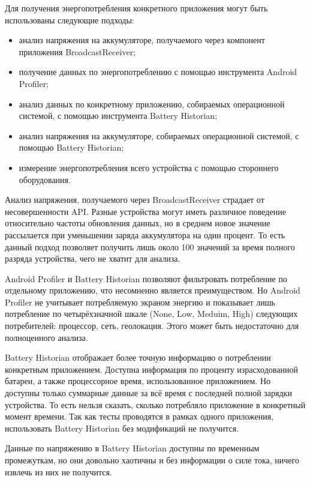 \documentclass[a4paper,14pt]{extarticle} %
\begin{document}
	Для получения энергопотребления конкретного приложения могут быть использованы следующие подходы:
	\begin{itemize}
		\item анализ напряжения на аккумуляторе, получаемого через компонент приложения BroadcastReceiver;
		\item получение данных по энергопотреблению с помощью инструмента Android Profiler;
		\item анализ данных по конкретному приложению, собираемых операционной системой, с помощью инструмента Battery Historian;
		\item анализ напряжения на аккумуляторе, собираемых операционной системой, с помощью Battery Historian;
		\item измерение энергопотребления всего устройства с помощью стороннего оборудования.
	\end{itemize}

	Анализ напряжения, получаемого через BroadcastReceiver страдает от несовершенности API. Разные устройства могут иметь различное поведение относительно частоты обновления данных, но в среднем новое значение рассылается при уменьшении заряда аккумулятора на один процент. То есть данный подход позволяет получить лишь около 100 значений за время полного разряда устройства, чего не хватит для анализа.
	
	Android Profiler и Battery Historian позволяют фильтровать потребление по отдельному приложению, что несомненно является преимуществом. Но Android Profiler не учитывает потребляемую экраном энергию и показывает лишь потребление по четырёхзначной шкале (None, Low, Meduim, High) следующих потребителей: процессор, сеть, геолокация. Этого может быть недостаточно для полноценного анализа.
	
	Battery Historian отображает более точную информацию о потреблении конкретным приложением. Доступна информация по проценту израсходованной батареи, а также процессорное время, использованное приложением. Но доступны только суммарные данные за всё время с последней полной зарядки устройства. То есть нельзя сказать, сколько потребляло приложение в конкретный момент времени. Так как тесты проводятся в рамках одного приложения, использовать Battery Historian без модификаций не получится. 
	
	Данные по напряжению в Battery Historian доступны по временным промежуткам, но они довольно хаотичны \ris{\ref{fig:historian_voltage}} и без информации о силе тока, ничего извлечь из них не получится.
	
\end{document}
